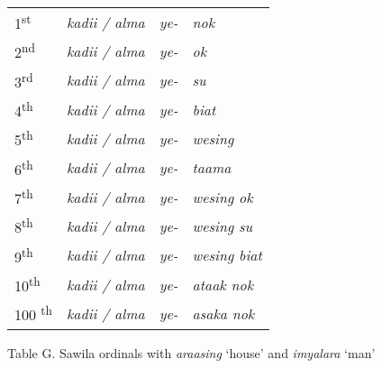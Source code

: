 \begin{flushleft}
\tablehead{}
\begin{supertabular}{m{0.5254598in}m{0.93025976in}m{0.42055985in}m{5.01776in}}
1\textsuperscript{st} &
\textit{kadii / alma} &
\textit{ye-} &
\textit{nok}\\
2\textsuperscript{nd} &
\textit{kadii / alma} &
\textit{ye-} &
\textit{ok}\\
3\textsuperscript{rd} &
\textit{kadii / alma} &
\textit{ye-} &
\textit{su}\\
4\textsuperscript{th} &
\textit{kadii / alma} &
\textit{ye-} &
\textit{biat}\\
5\textsuperscript{th} &
\textit{kadii / alma} &
\textit{ye-} &
\textit{wesing}\\
6\textsuperscript{th} &
\textit{kadii / alma} &
\textit{ye-} &
\textit{taama}\\
7\textsuperscript{th} &
\textit{kadii / alma} &
\textit{ye-} &
\textit{wesing ok}\\
8\textsuperscript{th} &
\textit{kadii / alma} &
\textit{ye-} &
\textit{wesing su}\\
9\textsuperscript{th} &
\textit{kadii / alma} &
\textit{ye-} &
\textit{wesing biat}\\
10\textsuperscript{th} &
\textit{kadii / alma} &
\textit{ye-} &
\textit{ataak nok}\\
100\textsuperscript{ th}  &
\textit{kadii / alma} &
\textit{ye-} &
\textit{asaka nok}\\
\end{supertabular}
\end{flushleft}
Table G. Sawila ordinals with \textit{araasing }{\textquoteleft}house{\textquoteright} and \textit{imyalara }{\textquoteleft}man{\textquoteright} 

